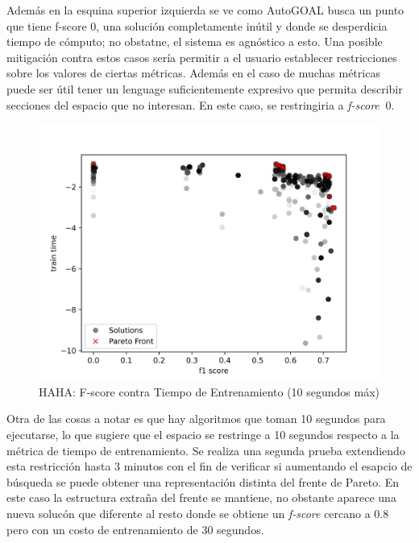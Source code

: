 Adem\'as en la esquina superior izquierda se ve como AutoGOAL busca un punto que tiene f-score 0, una soluci\'on completamente in\'util y donde se desperdicia tiempo de c\'omputo; no obstatne, el sistema es agn\'ostico a esto. Una posible mitigaci\'on contra estos casos ser\'ia permitir a el usuario establecer restricciones sobre los valores de ciertas m\'etricas. Adem\'as en el caso de muchas m\'etricas puede ser \'util  tener un lenguage suficientemente expresivo que permita describir secciones del espacio que no interesan. En este caso, se restringiria a \textit{f-score} $\> 0$.

\begin{figure}[ht]
    \centering
    \includegraphics[scale=0.65]{Pictures/haha_fscore_vs_time.jpg}
    \caption{HAHA: F-score contra Tiempo de Entrenamiento (10 segundos m\'ax)}
    \label{impl:fig:haha:fscore_vs_time}
\end{figure}

Otra de las cosas a notar es que hay algoritmos que toman 10 segundos para ejecutarse, lo que sugiere que el espacio se restringe a 10 segundos respecto a la m\'etrica de tiempo de entrenamiento. Se realiza una segunda prueba extendiendo esta restricci\'on hasta 3 minutos con el fin de verificar si aumentando el esapcio de b\'usqueda se puede obtener una representaci\'on distinta del frente de Pareto. En este caso la estructura extra\~na del frente se mantiene, no obstante aparece una nueva soluc\'on que diferente al resto donde se obtiene un \textit{f-score} cercano a 0.8 pero con un costo de entrenamiento de 30 segundos.

